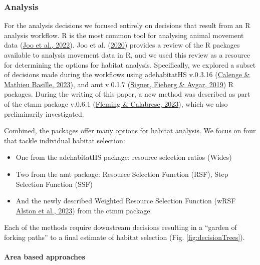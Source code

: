 \documentclass[10pt,a4paper]{article}
\begin{document}
\begin{figure}
\end{figure}

\hypertarget{analysis}{%
\subsubsection{Analysis}\label{analysis}}

For the analysis decisions we focused entirely on decisions that result from an R analysis workflow.
R is the most common tool for analysing animal movement data (\protect\hyperlink{ref-joo_recent_2022}{Joo et al., 2022}).
Joo et al. (\protect\hyperlink{ref-joo_navigating_2020}{2020}) provides a review of the R packages available to analysis movement data in R, and we used this review as a resource for determining the options for habitat analysis.
Specifically, we explored a subset of decisions made during the workflows using adehabitatHS v.0.3.16 (\protect\hyperlink{ref-adehabitatHS}{Calenge \& Mathieu Basille, 2023}), and amt v.0.1.7 (\protect\hyperlink{ref-amt}{Signer, Fieberg \& Avgar, 2019}) R packages.
During the writing of this paper, a new method was described as part of the ctmm package v.0.6.1 (\protect\hyperlink{ref-ctmm}{Fleming \& Calabrese, 2023}), which we also preliminarily investigated.

Combined, the packages offer many options for habitat analysis.
We focus on four that tackle individual habitat selection:

\begin{itemize}
\item
  One from the adehabitatHS package: resource selection ratios (Wides)
\item
  Two from the amt package: Resource Selection Function (RSF), Step Selection Function (SSF)
\item
  And the newly described Weighted Resource Selection Function (wRSF \protect\hyperlink{ref-alston_mitigating_2023}{Alston et al., 2023}) from the ctmm package.
\end{itemize}

Each of the methods require downstream decisions resulting in a ``garden of forking paths'' to a final estimate of habitat selection (Fig. \ref{fig:decisionTrees}).

\hypertarget{area-based-approaches}{%
\paragraph{Area based approaches}\label{area-based-approaches}}
\end{document}
